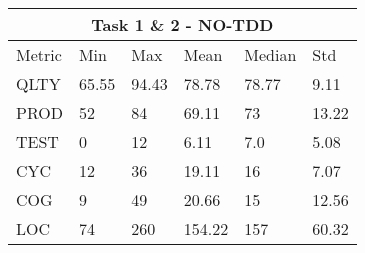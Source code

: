 \noindent
\begin{tabular}{ |p{2cm}||p{1.6cm}|p{1.6cm}|p{1.6cm}|p{1.6cm}|p{1.6cm}|}
    \hline
        \multicolumn{6}{|c|}{Task 1 \& 2 - NO-TDD} \\
    \hline
        Metric & Min & Max & Mean & Median & Std\\
    \hline
        QLTY & 65.55 & 94.43 & 78.78 & 78.77 & 9.11 \\
        PROD & 52 & 84 & 69.11 & 73 & 13.22 \\
        TEST & 0 & 12 & 6.11 & 7.0 & 5.08 \\
        CYC & 12 & 36 & 19.11 & 16 & 7.07 \\
        COG & 9 & 49 & 20.66 & 15 & 12.56 \\
        LOC & 74 & 260 & 154.22 & 157 & 60.32 \\
    \hline
\end{tabular}